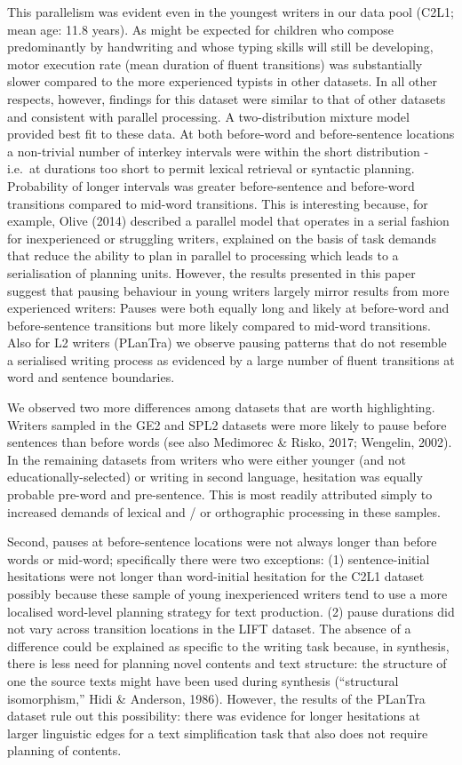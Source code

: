 \documentclass[
  man,floatsintext]{apa7}
\begin{document}
This parallelism was evident even in the youngest writers in our data pool (C2L1; mean age: 11.8 years). As might be expected for children who compose predominantly by handwriting and whose typing skills will still be developing, motor execution rate (mean duration of fluent transitions) was substantially slower compared to the more experienced typists in other datasets. In all other respects, however, findings for this dataset were similar to that of other datasets and consistent with parallel processing. A two-distribution mixture model provided best fit to these data. At both before-word and before-sentence locations a non-trivial number of interkey intervals were within the short distribution - i.e.~at durations too short to permit lexical retrieval or syntactic planning. Probability of longer intervals was greater before-sentence and before-word transitions compared to mid-word transitions. This is interesting because, for example, Olive (2014) described a parallel model that operates in a serial fashion for inexperienced or struggling writers, explained on the basis of task demands that reduce the ability to plan in parallel to processing which leads to a serialisation of planning units. However, the results presented in this paper suggest that pausing behaviour in young writers largely mirror results from more experienced writers: Pauses were both equally long and likely at before-word and before-sentence transitions but more likely compared to mid-word transitions. Also for L2 writers (PLanTra) we observe pausing patterns that do not resemble a serialised writing process as evidenced by a large number of fluent transitions at word and sentence boundaries.

We observed two more differences among datasets that are worth highlighting. Writers sampled in the GE2 and SPL2 datasets were more likely to pause before sentences than before words (see also Medimorec \& Risko, 2017; Wengelin, 2002). In the remaining datasets from writers who were either younger (and not educationally-selected) or writing in second language, hesitation was equally probable pre-word and pre-sentence. This is most readily attributed simply to increased demands of lexical and / or orthographic processing in these samples.

Second, pauses at before-sentence locations were not always longer than before words or mid-word; specifically there were two exceptions: (1) sentence-initial hesitations were not longer than word-initial hesitation for the C2L1 dataset possibly because these sample of young inexperienced writers tend to use a more localised word-level planning strategy for text production. (2) pause durations did not vary across transition locations in the LIFT dataset. The absence of a difference could be explained as specific to the writing task because, in synthesis, there is less need for planning novel contents and text structure: the structure of one the source texts might have been used during synthesis (\enquote{structural isomorphism,} Hidi \& Anderson, 1986). However, the results of the PLanTra dataset rule out this possibility: there was evidence for longer hesitations at larger linguistic edges for a text simplification task that also does not require planning of contents.
\end{document}
